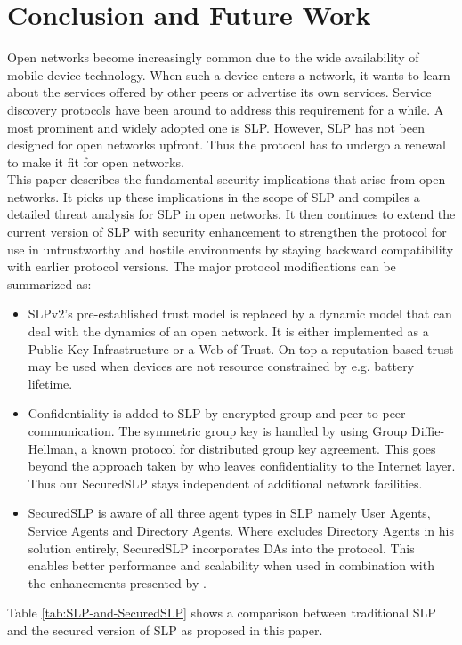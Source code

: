 \section{Conclusion and Future Work}\label{sec:conclusion}
Open networks become increasingly common due to the wide availability of mobile device technology. When such a device enters a network, it wants to learn about the services offered by other peers or advertise its own services. Service discovery protocols have been around to address this requirement for a while. A most prominent and widely adopted one is SLP. However, SLP has not been designed for open networks upfront. Thus the protocol has to undergo a renewal to make it fit for open networks.\\
This paper describes the fundamental security implications that arise from open networks. It picks up these implications in the scope of SLP and compiles a detailed threat analysis for SLP in open networks. It then continues to extend the current version of SLP with security enhancement to strengthen the protocol for use in untrustworthy and hostile environments by staying backward compatibility with earlier protocol versions. The major protocol modifications can be summarized as:
\begin{itemize}
\item SLPv2's pre-established trust model is replaced by a dynamic model that can deal with the dynamics of an open network. It is either implemented as a Public Key Infrastructure or a Web of Trust. On top a reputation based trust may be used when devices are not resource constrained by e.g. battery lifetime.
\item Confidentiality is added to SLP by encrypted group and peer to peer communication. The symmetric group key is handled by using Group Diffie-Hellman, a known protocol for distributed group key agreement. This goes beyond the approach taken by \citet{Hollick2001} who leaves confidentiality to the Internet layer. Thus our SecuredSLP stays independent of additional network facilities.
\item SecuredSLP is aware of all three agent types in SLP namely User Agents, Service Agents and Directory Agents. Where \citet{Hollick2001} excludes Directory Agents in his solution entirely, SecuredSLP incorporates DAs into the protocol. This enables better performance and scalability when used in combination with the enhancements presented by \citet{Zhao2003}.
\end{itemize}
Table \ref{tab:SLP-and-SecuredSLP} shows a comparison between traditional SLP and the secured version of SLP as proposed in this paper.
